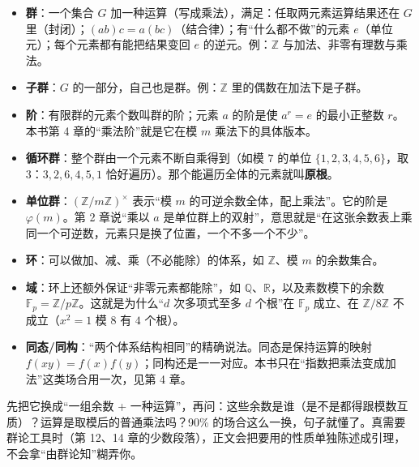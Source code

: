 \documentclass[UTF8,a4paper,11pt,oneside,openany,fontset=fandol]{ctexbook}
\theoremstyle{definition}
\newcommand{\Z}{\mathbb Z}
\begin{document}
\begin{itemize}
\item \textbf{群}：一个集合 $G$ 加一种运算（写成乘法），满足：任取两元素运算结果还在 $G$ 里（封闭）；$(ab)c=a(bc)$（结合律）；有“什么都不做”的元素 $e$（单位元）；每个元素都有能把结果变回 $e$ 的逆元。例：$\Z$ 与加法、非零有理数与乘法。
\item \textbf{子群}：$G$ 的一部分，自己也是群。例：$\Z$ 里的偶数在加法下是子群。
\item \textbf{阶}：有限群的元素个数叫群的阶；元素 $a$ 的阶是使 $a^r=e$ 的最小正整数 $r$。本书第 4 章的“乘法阶”就是它在模 $m$ 乘法下的具体版本。
\item \textbf{循环群}：整个群由一个元素不断自乘得到（如模 $7$ 的单位 $\{1,2,3,4,5,6\}$，取 $3$：$3,2,6,4,5,1$ 恰好遍历）。那个能遍历全体的元素就叫\textbf{原根}。
\item \textbf{单位群}：$(\Z/m\Z)^{\times}$ 表示“模 $m$ 的可逆余数全体，配上乘法”。它的阶是 $\varphi(m)$。第 2 章说“乘以 $a$ 是单位群上的双射”，意思就是“在这张余数表上乘同一个可逆数，元素只是换了位置，一个不多一个不少”。
\item \textbf{环}：可以做加、减、乘（不必能除）的体系，如 $\Z$、模 $m$ 的余数集合。
\item \textbf{域}：环上还额外保证“非零元素都能除”，如 $\mathbb Q$、$\mathbb R$，以及素数模下的余数 $\mathbb F_p=\Z/p\Z$。这就是为什么“$d$ 次多项式至多 $d$ 个根”在 $\mathbb F_p$ 成立、在 $\Z/8\Z$ 不成立（$x^2=1$ 模 $8$ 有 $4$ 个根）。
\item \textbf{同态/同构}：“两个体系结构相同”的精确说法。同态是保持运算的映射 $f(xy)=f(x)f(y)$；同构还是一一对应。本书只在“指数把乘法变成加法”这类场合用一次，见第 4 章。
\end{itemize}

\begin{tip}[遇到“群”字时的实用策略]
先把它换成“一组余数 + 一种运算”，再问：这些余数是谁（是不是都得跟模数互质）？运算是取模后的普通乘法吗？90\% 的场合这么一换，句子就懂了。真需要群论工具时（第 12、14 章的少数段落），正文会把要用的性质单独陈述成引理，不会拿“由群论知”糊弄你。
\end{tip}
\end{document}
